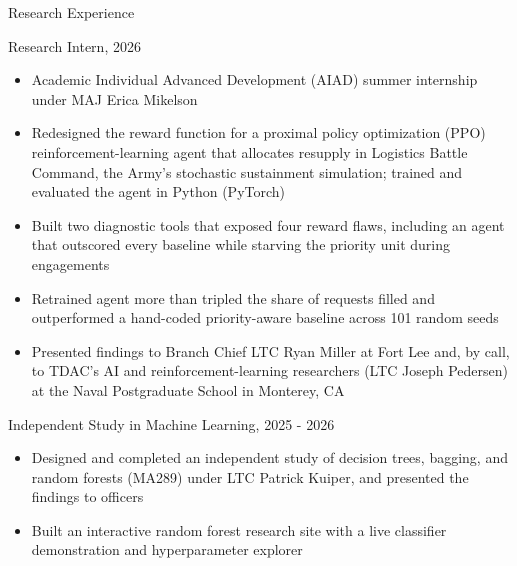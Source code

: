 \documentclass{resume}
\begin{document}
\begin{rSection}{Research Experience}
\begin{rSubsection}{Research Intern, }{2026}{}
\vspace{-3pt}
\begin{itemize}
\setlength\itemsep{-1.5ex}
    \item Academic Individual Advanced Development (AIAD) summer internship under MAJ Erica Mikelson
    \item Redesigned the reward function for a proximal policy optimization (PPO) reinforcement-learning agent that allocates resupply in Logistics Battle Command, the Army's stochastic sustainment simulation; trained and evaluated the agent in Python (PyTorch)
    \item Built two diagnostic tools that exposed four reward flaws, including an agent that outscored every baseline while starving the priority unit during engagements
    \item Retrained agent more than tripled the share of requests filled and outperformed a hand-coded priority-aware baseline across 101 random seeds
    \item Presented findings to Branch Chief LTC Ryan Miller at Fort Lee and, by call, to TDAC's AI and reinforcement-learning researchers (LTC Joseph Pedersen) at the Naval Postgraduate School in Monterey, CA
\end{itemize}
\end{rSubsection}

\begin{rSubsection}{Independent Study in Machine Learning, }{2025 - 2026}{}
\vspace{-3pt}
\begin{itemize}
\setlength\itemsep{-1.5ex}
    \item Designed and completed an independent study of decision trees, bagging, and random forests (MA289) under LTC Patrick Kuiper, and presented the findings to officers
    \item Built an interactive random forest research site with a live classifier demonstration and hyperparameter explorer
\end{itemize}
\end{rSubsection}

\vspace{-3pt}
\end{rSection}
\end{document}
